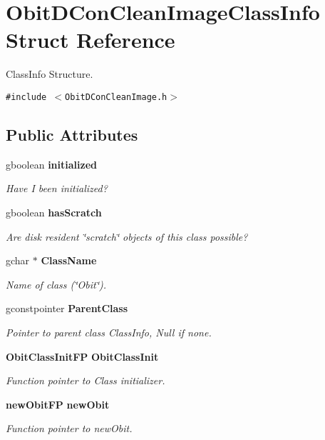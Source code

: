 \section{Obit\-DCon\-Clean\-Image\-Class\-Info Struct Reference}
\label{structObitDConCleanImageClassInfo}
Class\-Info Structure.  


{\tt \#include $<$Obit\-DCon\-Clean\-Image.h$>$}

\subsection*{Public Attributes}
\begin{CompactItemize}
\item 
gboolean {\bf initialized}
\begin{CompactList}\small\item\em Have I been initialized? \item\end{CompactList}\item 
gboolean {\bf has\-Scratch}
\begin{CompactList}\small\item\em Are disk resident \char`\"{}scratch\char`\"{} objects of this class possible? \item\end{CompactList}\item 
gchar $\ast$ {\bf Class\-Name}
\begin{CompactList}\small\item\em Name of class (\char`\"{}Obit\char`\"{}). \item\end{CompactList}\item 
gconstpointer {\bf Parent\-Class}
\begin{CompactList}\small\item\em Pointer to parent class Class\-Info, Null if none. \item\end{CompactList}\item 
{\bf Obit\-Class\-Init\-FP} {\bf Obit\-Class\-Init}
\begin{CompactList}\small\item\em Function pointer to Class initializer. \item\end{CompactList}\item 
{\bf new\-Obit\-FP} {\bf new\-Obit}
\begin{CompactList}\small\item\em Function pointer to new\-Obit. \item\end{CompactList}\item 

\end{CompactItemize}
